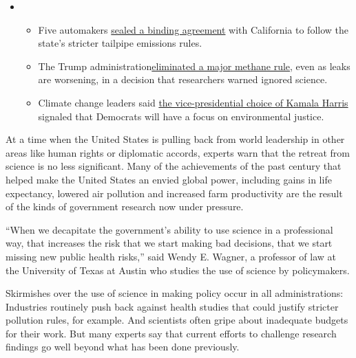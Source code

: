 \begin{itemize}
\item
  \begin{itemize}
  \tightlist
  \item
    Five automakers
    \href{https://www.nytimes3xbfgragh.onion/2020/08/17/climate/california-automakers-pollution.html?action=click\&pgtype=Article\&state=default\&region=MAIN_CONTENT_1\&context=storylines_keepup}{sealed
    a binding agreement} with California to follow the state's stricter
    tailpipe emissions rules.
  \item
    The Trump
    administration\href{https://www.nytimes3xbfgragh.onion/2020/08/13/climate/trump-methane.html?action=click\&pgtype=Article\&state=default\&region=MAIN_CONTENT_1\&context=storylines_keepup}{eliminated
    a major methane rule}, even as leaks are worsening, in a decision
    that researchers warned ignored science.
  \item
    Climate change leaders said
    \href{https://www.nytimes3xbfgragh.onion/2020/08/12/climate/kamala-harris-environmental-justice.html?action=click\&pgtype=Article\&state=default\&region=MAIN_CONTENT_1\&context=storylines_keepup}{the
    vice-presidential choice of Kamala Harris} signaled that Democrats
    will have a focus on environmental justice.
  \end{itemize}
\end{itemize}

At a time when the United States is pulling back from world leadership
in other areas like human rights or diplomatic accords, experts warn
that the retreat from science is no less significant. Many of the
achievements of the past century that helped make the United States an
envied global power, including gains in life expectancy, lowered air
pollution and increased farm productivity are the result of the kinds of
government research now under pressure.

``When we decapitate the government's ability to use science in a
professional way, that increases the risk that we start making bad
decisions, that we start missing new public health risks,'' said Wendy
E. Wagner, a professor of law at the University of Texas at Austin who
studies the use of science by policymakers.

Skirmishes over the use of science in making policy occur in all
administrations: Industries routinely push back against health studies
that could justify stricter pollution rules, for example. And scientists
often gripe about inadequate budgets for their work. But many experts
say that current efforts to challenge research findings go well beyond
what has been done previously.

